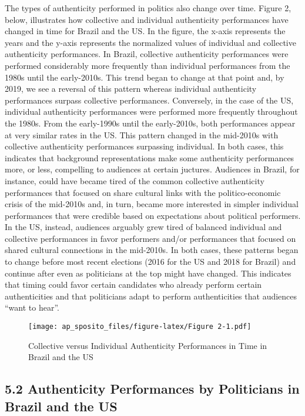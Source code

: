\documentclass[
  12pt,
]{article}
\begin{document}
The types of authenticity performed in politics also change over time.
Figure 2, below, illustrates how collective and individual authenticity
performances have changed in time for Brazil and the US. In the figure,
the x-axis represents the years and the y-axis represents the normalized
values of individual and collective authenticity performances. In
Brazil, collective authenticity performances were performed considerably
more frequently than individual performances from the 1980s until the
early-2010s. This trend began to change at that point and, by 2019, we
see a reversal of this pattern whereas individual authenticity
performances surpass collective performances. Conversely, in the case of
the US, individual authenticity performances were performed more
frequently throughout the 1980s. From the early-1990s until the
early-2010s, both performances appear at very similar rates in the US.
This pattern changed in the mid-2010s with collective authenticity
performances surpassing individual. In both cases, this indicates that
background representations make some authenticity performances more, or
less, compelling to audiences at certain juctures. Audiences in Brazil,
for instance, could have became tired of the common collective
authenticity performances that focused on share cultural links with the
politico-economic crisis of the mid-2010s and, in turn, became more
interested in simpler individual performances that were credible based
on expectations about political performers. In the US, instead,
audiences arguably grew tired of balanced individual and collective
performances in favor performers and/or performances that focused on
shared cultural connections in the mid-2010s. In both cases, these
patterns began to change before most recent elections (2016 for the US
and 2018 for Brazil) and continue after even as politicians at the top
might have changed. This indicates that timing could favor certain
candidates who already perform certain authenticities and that
politicians adapt to perform authenticities that audiences ``want to
hear''.

\begin{figure}
\centering
\texttt{[image: ap\_sposito\_files/figure-latex/Figure 2-1.pdf]}
\caption{Collective versus Individual Authenticity Performances in Time
in Brazil and the US}
\end{figure}

\hypertarget{authenticity-performances-by-politicians-in-brazil-and-the-us}{%
\subsection{5.2 Authenticity Performances by Politicians in Brazil and
the
US}\label{authenticity-performances-by-politicians-in-brazil-and-the-us}}
\end{document}
